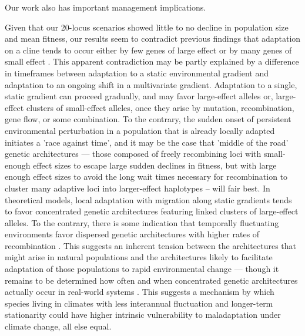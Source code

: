 \documentclass[9pt,twocolumn,twoside,lineno]{pnas-new}
\begin{document}
Our work also has important management implications.   

Given that our 20-locus scenarios showed little to no decline in population size and mean fitness, our results seem to contradict previous findings that adaptation on a cline tends to occur either by few genes of large effect or by many genes of small effect \cite{yeaman_amnat}. This apparent contradiction may be partly explained by a difference in timeframes between adaptation to a static environmental gradient and adaptation to an ongoing shift in a multivariate gradient. Adaptation to a single, static gradient can proceed gradually, and may favor large-effect alleles or, large-effect clusters of small-effect alleles, once they arise by mutation, recombination, gene flow, or some combination. To the contrary, the sudden onset of persistent environmental perturbation in a population that is already locally adapted initiates a 'race against time', and it may be the case that 'middle of the road' genetic architectures --- those composed of freely recombining loci with small-enough effect sizes to escape large sudden declines in fitness, but with large enough effect sizes to avoid the long wait times necessary for recombination to cluster many adaptive loci into larger-effect haplotypes  -- will fair best. In theoretical models, local adaptation with migration along static gradients tends to favor concentrated genetic architectures featuring linked clusters of large-effect alleles. To the contrary, there is some indication that temporally fluctuating environments favor dispersed genetic architectures with higher rates of recombination \cite{burger,kondrashov,yeaman_review,yeaman_whitlock}. This suggests an inherent tension between the architectures that might arise in natural populations and the architectures likely to facilitate adaptation of those populations to rapid environmental change --- though it remains to be determined how often and when concentrated genetic architectures actually occur in real-world systems \cite{laruson}.  This suggests a mechanism by which species living in climates with less interannual fluctuation and longer-term stationarity could have higher intrinsic vulnerability to maladaptation under climate change, all else equal.
   
\end{document}
